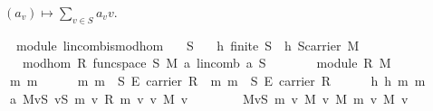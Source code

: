 \begin{isabellebody}
\begin{isamarkuptext}
 $(a_v)\mapsto \sum_{v\in S} a_vv$.%
\end{isamarkuptext}%
\isamarkuptrue%
\isamarkupfalse%
\ {\isacharparenleft}\ module{\isacharparenright}\ lincomb{\isacharunderscore}is{\isacharunderscore}mod{\isacharunderscore}hom{\isacharcolon}\isanewline
\ \ \ S\isanewline
\ \ \ h{\isacharcolon}\ {\isachardoublequoteopen}finite\ S{\isachardoublequoteclose}\ \ h{}{\isacharcolon}\ {\isachardoublequoteopen}S{\isasymsubseteq}carrier\ M{\isachardoublequoteclose}\isanewline
\ \ \ {\isachardoublequoteopen}mod{\isacharunderscore}hom\ R\ {\isacharparenleft}func{\isacharunderscore}space\ S{\isacharparenright}\ M\ {\isacharparenleft}{\isasymlambda}a{\isachardot}\ lincomb\ a\ S{\isacharparenright}{\isachardoublequoteclose}\ \isanewline
%
\isadelimproof
%
\endisadelimproof
%
\isatagproof
{}\isamarkupfalse%
\ {\isacharminus}\isanewline
\ \ \isamarkupfalse%
\ {}{\isacharcolon}\ {\isachardoublequoteopen}module\ R\ M{\isachardoublequoteclose}\isacommand{{\isachardot}{\isachardot}}\isamarkupfalse%
\isanewline
\ \ \isacommand{{\isacharbraceleft}}\isamarkupfalse%
\ \isanewline
\ \ \ \ \isamarkupfalse%
\ m{}\ m{}\isanewline
\ \ \ \ \isamarkupfalse%
\ m{}{\isacharcolon}\ {\isachardoublequoteopen}m{}\ {\isasymin}\ S\ {\isasymrightarrow}\isactrlsub E\ carrier\ R{\isachardoublequoteclose}\ \ m{}{\isacharcolon}\ {\isachardoublequoteopen}m{}\ {\isasymin}\ S\ {\isasymrightarrow}\isactrlsub E\ carrier\ R{\isachardoublequoteclose}\isanewline
\ \ \ \ \isamarkupfalse%
\ h\ h{}\ m{}\ m{}\ \isamarkupfalse%
\ a{}{\isacharcolon}\ {\isachardoublequoteopen}{\isacharparenleft}{\isasymOplus}\isactrlbsub M\isactrlesub v{\isasymin}S{\isachardot}\ {\isacharparenleft}{\isasymlambda}v{\isasymin}S{\isachardot}\ m{}\ v\ {\isasymoplus}\isactrlbsub R\isactrlesub \ m{}\ v{\isacharparenright}\ v\ {\isasymodot}\isactrlbsub M\isactrlesub \ v{\isacharparenright}\ {\isacharequal}\ \isanewline
\ \ \ \ \ \ {\isacharparenleft}{\isasymOplus}\isactrlbsub M\isactrlesub v{\isasymin}S{\isachardot}\ m{}\ v\ {\isasymodot}\isactrlbsub M\isactrlesub \ v\ {\isasymoplus}\isactrlbsub M\isactrlesub \ m{}\ v\ {\isasymodot}\isactrlbsub M\isactrlesub \ v{\isacharparenright}{\isachardoublequoteclose}\isanewline

\end{isabellebody}
